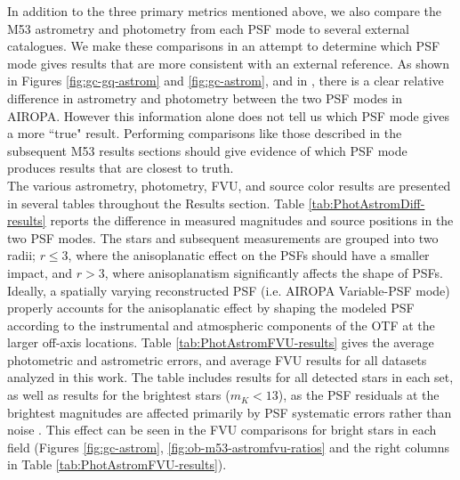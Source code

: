 \documentclass[]{spie}  %
\begin{document}
\indent In addition to the three primary metrics mentioned above, we also compare the M53 astrometry and photometry from each PSF mode to several external catalogues. We make these comparisons in an attempt to determine which PSF mode gives results that are more consistent with an external reference. As shown in Figures \ref{fig:gc-gq-astrom} and \ref{fig:gc-astrom}, and in \cite{Turri:inprep}, there is a clear relative difference in astrometry and photometry between the two PSF modes in AIROPA. However this information alone does not tell us which PSF mode gives a more ``true" result. Performing comparisons like those described in the subsequent M53 results sections should give evidence of which PSF mode produces results that are closest to truth.
\\
\indent The various astrometry, photometry, FVU, and source color results are presented in several tables throughout the Results section. Table \ref{tab:PhotAstromDiff-results} reports the difference in measured magnitudes and source positions in the two PSF modes. The stars and subsequent measurements are grouped into two radii; $r \leq 3$\textquotesingle\textquotesingle, where the anisoplanatic effect on the PSFs should have a smaller impact, and $r > 3$\textquotesingle\textquotesingle, where anisoplanatism significantly affects the shape of PSFs. Ideally, a spatially varying reconstructed PSF (i.e. AIROPA Variable-PSF mode) properly accounts for the anisoplanatic effect by shaping the modeled PSF according to the instrumental and atmospheric components of the OTF at the larger off-axis locations. Table \ref{tab:PhotAstromFVU-results} gives the average photometric and astrometric errors, and average FVU results for all datasets analyzed in this work. The table includes results for all detected stars in each set, as well as results for the brightest stars ($m_K < 13$), as the PSF residuals at the brightest magnitudes are affected primarily by PSF systematic errors rather than noise \cite{Turri:inprep}. This effect can be seen in the FVU comparisons for bright stars in each field (Figures \ref{fig:gc-astrom}, \ref{fig:ob-m53-astromfvu-ratios} and the right columns in Table \ref{tab:PhotAstromFVU-results}).
\end{document}
